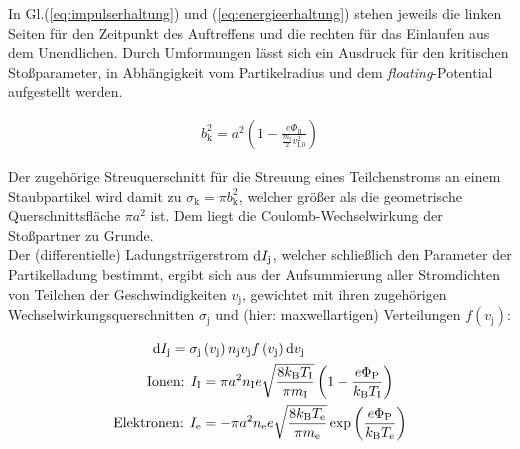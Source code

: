\documentclass[numbers=noenddot,a4paper]{scrartcl}
\newcommand{\diff}{\textnormal{d}}
\newcommand{\ix}[1]{_\text{#1}}
\newcommand{\tilt}[1]{\textit{#1}}
\begin{document}
			In Gl.(\ref{eq:impulserhaltung}) und (\ref{eq:energieerhaltung}) stehen jeweils die linken Seiten für den Zeitpunkt des Auftreffens und die rechten für das Einlaufen aus dem Unendlichen. Durch Umformungen lässt sich ein Ausdruck für den kritischen Stoßparameter, in Abhängigkeit vom Partikelradius und dem \tilt{floating}-Potential aufgestellt werden.

				\begin{align}
					b\ix{k}^2=a^2\left(1-\frac{e\Phi\ix{fl}}{\frac{m\ix{I}}{2}v\ix{I,0}^2}\right) \label{eq:krit}
				\end{align}

			Der zugehörige Streuquerschnitt für die Streuung eines Teilchenstroms an einem Staubpartikel wird damit zu $\sigma\ix{k}=\pi b\ix{k}^2$, welcher größer als die geometrische Querschnittsfläche $\pi a^2$ ist. Dem liegt die Coulomb-Wechselwirkung der Stoßpartner zu Grunde.\\
			Der (differentielle) Ladungsträgerstrom $\diff I\ix{j}$, welcher schließlich den Parameter der Partikelladung bestimmt, ergibt sich aus der Aufsummierung aller Stromdichten von Teilchen der Geschwindigkeiten $v\ix{j}$, gewichtet mit ihren zugehörigen Wechselwirkungsquerschnitten $\sigma\ix{j}$ und (hier: maxwellartigen) Verteilungen $f\left(v\ix{j}\right)$:

				\begin{align}
					\diff I\ix{j}=\sigma\ix{j}&\left(v\ix{j}\right)n\ix{j}v\ix{j}f\left(v\ix{j}\right)\diff v\ix{j} \nonumber \\
					\text{Ionen: } I\ix{I}&=\pi a^2n\ix{I}e\sqrt{\frac{8k\ix{B}T\ix{I}}{\pi m\ix{I}}}\left(1-\frac{e\Phi\ix{P}}{k\ix{B}T\ix{I}}\right) \label{eq:ionenstrom} \\
					\text{Elektronen: } I\ix{e}&=-\pi a^2n\ix{e}e\sqrt{\frac{8k\ix{B}T\ix{e}}{\pi m\ix{e}}}\exp\left(\frac{e\Phi\ix{P}}{k\ix{B}T\ix{e}}\right) \label{eq:elektronenstrom}
				\end{align}
\end{document}
